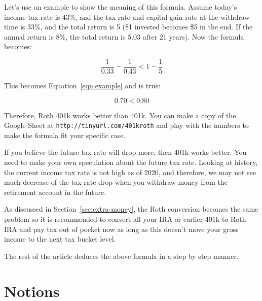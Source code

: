\documentclass[twocolumn]{article}
\let\url\nolinkurl %
\begin{document}
Let's use an example to show the meaning of this formula. Assume today's income tax rate is 43\%, and the tax rate and capital gain rate at the withdraw time is 33\%, and the total return is 5 (\$1 invested becomes \$5 in the end. If the annual return is 8\%, the total return is 5.03 after 21 years). Now the formula becomes:

\begin{equation}
  \frac{1}{0.33} - \frac{1}{0.43} < 1 - \frac{1}{5}
\end{equation}

This becomes Equation~\ref{eqn:example} and is true:

\begin{equation}
  0.70 < 0.80 \label{eqn:example}
\end{equation}

Therefore, Roth 401k works better than 401k. You can make a copy of the Google Sheet at \url{http://tinyurl.com/401kroth} and play with the numbers to make the formula fit your specific case.

If you believe the future tax rate will drop more, then 401k works better. You need to make your own speculation about the future tax rate. Looking at history, the current income tax rate is not high as of 2020, and therefore, we may not see much decrease of the tax rate drop when you withdraw money from the retirement account in the future.

As discussed in Section~\ref{sec:extra-money}, the Roth conversion becomes the same problem so it is recommended to convert all your IRA or earlier 401k to Roth IRA and pay tax out of pocket now as long as this doesn't move your gross income to the next tax bucket level.

The rest of the article deduces the above formula in a step by step manner.

\section{Notions}
\end{document}
